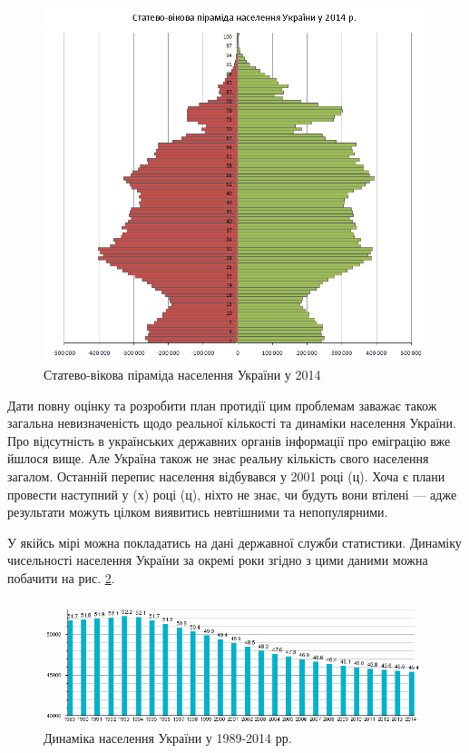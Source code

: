             \begin{figure}[!htp]
                \centering
                \includegraphics[scale = 0.4]{PNG/PopulationPyramideUkraine2013.PNG}
                \caption{Статево-вікова піраміда населення України у 2014}
                \label{fig:age14}
            \end{figure}

            Дати повну оцінку та розробити план протидії цим проблемам заважає також загальна невизначеність щодо реальної кількості
            та динаміки населення України. Про відсутність в українських державних органів інформації про еміграцію вже йшлося вище.
            Але Україна також не знає реальну кількість свого населення загалом. Останній перепис населення відбувався у 2001 році (ц).
            Хоча є плани провести наступний у (х) році (ц), ніхто не знає, чи будуть вони втілені --- адже результати можуть цілком виявитись
            невтішними та непопулярними.

            У якійсь мірі можна покладатись на дані державної служби статистики. Динаміку чисельності населення України за окремі роки
            згідно з цими даними можна побачити на рис. \ref{fig:popdyn}.

            \begin{figure}[!htp]
                \centering
                \includegraphics[scale = 0.6]{PNG/popdyn.png}
                \caption{Динаміка населення України у 1989-2014 рр.}
                \label{fig:popdyn}
            \end{figure}

